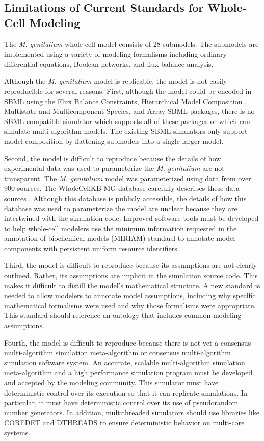 \documentclass[journal,transmag,twoside]{IEEEtran}
\begin{document}
\subsection{Limitations of Current Standards for Whole-Cell Modeling}

The \textit{M. genitalium} whole-cell model \cite{Karr2012} consists of 28 submodels.
The submodels are implemented using a variety of modeling formalisms including
ordinary differential equations, Boolean networks, and flux balance analysis.

Although the \textit{M. genitalium} model is replicable, the model is not easily reproducible for several reasons. First,
although the model could be encoded in SBML using the Flux Balance Constraints, Hierarchical Model Composition \cite{smith2015sbml}, Multistate and Multicomponent
Species, and Array SBML packages, there is no SBML-compatible simulator which supports all of these packages or 
which can simulate multi-algorithm models. The existing SBML simulators only support 
model composition by flattening submodels into a single larger model. 

Second, the model is difficult to reproduce because the details of how experimental data was used to parameterize the \textit{M. genitalium}
are not transparent. The \textit{M. genitalium} model was parameterized using data from over 900 
sources. The WholeCellKB-MG database carefully describes these data sources \cite{karr2013wholecellkb}. Although this database is publicly accessible, 
the details of how this database was used to parameterize the model are unclear
because they are intertwined with the simulation code. 
Improved software tools must be developed to help whole-cell modelers use the minimum information 
requested in the annotation of biochemical models (MIRIAM) \cite{novere2005minimum}
standard to annotate model components with persistent uniform resource identifiers. 

Third, the model is difficult to reproduce because its assumptions are not clearly outlined. Rather, its assumptions are
implicit in the simulation source code. This makes it difficult
to distill the model's mathematical structure. A new standard is needed to allow modelers to annotate model assumptions, including why
specific mathematical formalisms were used and why those formalisms were appropriate. This standard should reference an ontology that 
includes common modeling assumptions.

Fourth, the model is difficult to reproduce because there is not yet a consensus multi-algorithm simulation meta-algorithm 
or consensus multi-algorithm simulation software system. An accurate, scalable multi-algorithm simulation meta-algorithm
and a high performance simulation program must be developed and accepted by the modeling community. This 
simulator must have deterministic control over its execution so that it can replicate 
simulations. In particular, it must have deterministic control over its use of pseudorandom number generators. 
In addition, multithreaded simulators should use libraries like C{\small ORE}D{\small ET} and D{\small THREADS} to 
ensure deterministic behavior on multi-core systems.
\end{document}
